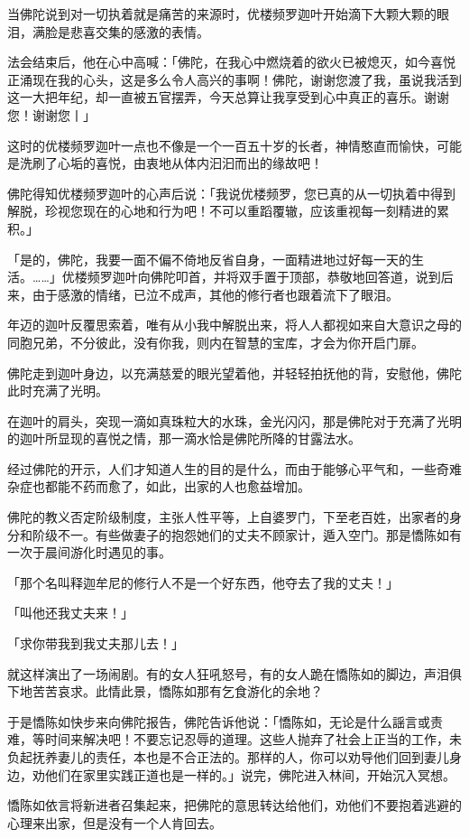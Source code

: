 \documentclass[12pt,twoside,openany]{book}
\begin{document}
当佛陀说到对一切执着就是痛苦的来源时，优楼频罗迦叶开始滴下大颗大颗的眼泪，满脸是悲喜交集的感激的表情。

法会结束后，他在心中高喊：「佛陀，在我心中燃烧着的欲火已被熄灭，如今喜悦正涌现在我的心头，这是多么令人高兴的事啊！佛陀，谢谢您渡了我，虽说我活到这一大把年纪，却一直被五官摆弄，今天总算让我享受到心中真正的喜乐。谢谢您！谢谢您丨」

这时的优楼频罗迦叶一点也不像是一个一百五十岁的长者，神情憨直而愉快，可能是洗刷了心垢的喜悦，由衷地从体内汩汩而出的缘故吧！

佛陀得知优楼频罗迦叶的心声后说：「我说优楼频罗，您已真的从一切执着中得到解脱，珍视您现在的心地和行为吧！不可以重蹈覆辙，应该重视每一刻精进的累积。」

「是的，佛陀，我要一面不偏不倚地反省自身，一面精进地过好每一天的生活。……」优楼频罗迦叶向佛陀叩首，并将双手置于顶部，恭敬地回答道，说到后来，由于感激的情绪，已泣不成声，其他的修行者也跟着流下了眼泪。

年迈的迦叶反覆思索着，唯有从小我中解脱出来，将人人都视如来自大意识之母的同胞兄弟，不分彼此，没有你我，则内在智慧的宝库，才会为你开启门扉。

佛陀走到迦叶身边，以充满慈爱的眼光望着他，并轻轻拍抚他的背，安慰他，佛陀此时充满了光明。

在迦叶的肩头，突现一滴如真珠粒大的水珠，金光闪闪，那是佛陀对于充满了光明的迦叶所显现的喜悦之情，那一滴水恰是佛陀所降的甘露法水。

经过佛陀的开示，人们才知道人生的目的是什么，而由于能够心平气和，一些奇难杂症也都能不药而愈了，如此，出家的人也愈益增加。

佛陀的教义否定阶级制度，主张人性平等，上自婆罗门，下至老百姓，出家者的身分和阶级不一。有些做妻子的抱怨她们的丈夫不顾家计，遁入空门。那是憍陈如有一次于晨间游化时遇见的事。

「那个名叫释迦牟尼的修行人不是一个好东西，他夺去了我的丈夫！」

「叫他还我丈夫来！」

「求你带我到我丈夫那儿去！」

就这样演出了一场闹剧。有的女人狂吼怒号，有的女人跪在憍陈如的脚边，声泪俱下地苦苦哀求。此情此景，憍陈如那有乞食游化的余地？

于是憍陈如快步来向佛陀报告，佛陀告诉他说：「憍陈如，无论是什么謡言或责难，等时间来解决吧！不要忘记忍辱的道理。这些人抛弃了社会上正当的工作，未负起抚养妻儿的责任，本也是不合正法的。那样的人，你可以劝导他们回到妻儿身边，劝他们在家里实践正道也是一样的。」说完，佛陀进入林间，开始沉入冥想。

憍陈如依言将新进者召集起来，把佛陀的意思转达给他们，劝他们不要抱着逃避的心理来出家，但是没有一个人肯回去。
\end{document}
